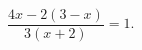\begin{ex}[type=equation]
	\begin{condition}
		$\dfrac{4x -2(3-x)}{3(x+2)} = 1.$
	\end{condition}
\end{ex}